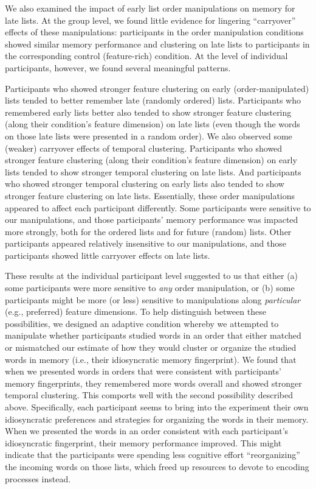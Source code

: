 \documentclass[11pt]{article}
\begin{document}
We also examined the impact of early list order manipulations on memory for
late lists. At the group level, we found little evidence for lingering
``carryover'' effects of these manipulations: participants in the order
manipulation conditions showed similar memory performance and clustering on
late lists to participants in the corresponding control (feature-rich)
condition. At the level of individual participants, however, we found several
meaningful patterns.

Participants who showed stronger feature clustering on early
(order-manipulated) lists tended to better remember late (randomly ordered)
lists. Participants who remembered early lists better also tended to show
stronger feature clustering (along their condition's feature dimension) on late
lists (even though the words on those late lists were presented in a random
order). We also observed some (weaker) carryover effects of temporal
clustering. Participants who showed stronger feature clustering (along their
condition's feature dimension) on early lists tended to show stronger temporal
clustering on late lists. And participants who showed stronger temporal
clustering on early lists also tended to show stronger feature clustering on
late lists. Essentially, these order manipulations appeared to affect each
participant differently. Some participants were sensitive to our manipulations,
and those participants' memory performance was impacted more strongly, both for
the ordered lists and for future (random) lists. Other participants appeared
relatively insensitive to our manipulations, and those participants showed
little carryover effects on late lists.

These results at the individual participant level suggested to us that either
(a) some participants were more sensitive to \textit{any} order manipulation,
or (b) some participants might be more (or less) sensitive to manipulations
along \textit{particular} (e.g., preferred) feature dimensions. To help
distinguish between these possibilities, we designed an adaptive condition
whereby we attempted to manipulate whether participants studied words in an
order that either matched or mismatched our estimate of how they would cluster
or organize the studied words in memory (i.e., their idiosyncratic memory
fingerprint). We found that when we presented words in orders that were
consistent with participants' memory fingerprints, they remembered more words
overall and showed stronger temporal clustering. This comports well with the
second possibility described above. Specifically, each participant seems to
bring into the experiment their own idiosyncratic preferences and strategies
for organizing the words in their memory. When we presented the words in an
order consistent with each participant's idiosyncratic fingerprint, their
memory performance improved. This might indicate that the participants were
spending less cognitive effort ``reorganizing'' the incoming words on those
lists, which freed up resources to devote to encoding processes instead.
\end{document}
